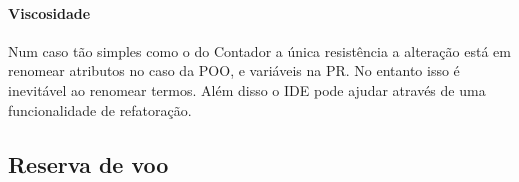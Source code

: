 \paragraph{Viscosidade}
\label{sec:org20a8b32}
Num caso tão simples como o do Contador a única resistência a alteração
está em renomear atributos no caso da POO, e variáveis na PR.
No entanto isso é inevitável ao renomear termos.
Além disso o IDE pode ajudar através de uma funcionalidade de refatoração.

\subsection{Reserva de voo}
\label{sec:org960050e}

